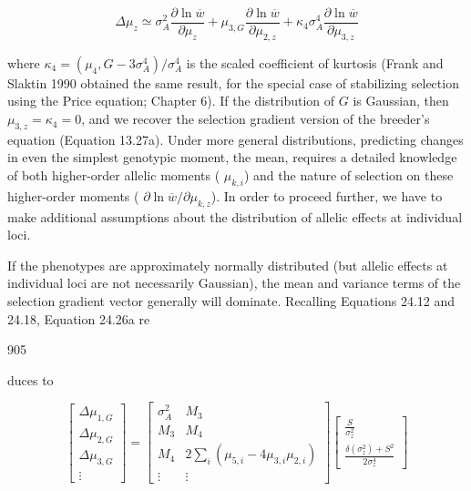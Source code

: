 \documentclass{article}
\begin{document}
\begin{equation}
\Delta\mu_{z}\simeq\sigma_{A}^{2}\frac{\partial\ln\overline{w}}{\partial\mu_{z}}+\mu_{3,G}\frac{\partial\ln\overline{w}}{\partial\mu_{2,z}}+\kappa_{4}\sigma_{A}^{4}\frac{\partial\ln\overline{w}}{\partial\mu_{3,z}}
\tag{24.27}
\label{eq:24_27}
\end{equation}

where  $ \kappa_4 = (\mu_4, G - 3\sigma_A^4)/\sigma_A^4 $ is the scaled coefficient of kurtosis (Frank and Slaktin 1990 obtained the same result, for the special case of stabilizing selection using the Price equation; Chapter 6). If the distribution of  $ G $ is Gaussian, then  $ \mu_{3,z} = \kappa_4 = 0 $, and we recover the selection gradient version of the breeder's equation (Equation 13.27a). Under more general distributions, predicting changes in even the simplest genotypic moment, the mean, requires a detailed knowledge of both higher-order allelic moments ( $ \mu_{k,i} $) and the nature of selection on these higher-order moments ( $ \partial \ln \overline{w} / \partial \mu_{k,z} $). In order to proceed further, we have to make additional assumptions about the distribution of allelic effects at individual loci.

If the phenotypes are approximately normally distributed (but allelic effects at individual loci are not necessarily Gaussian), the mean and variance terms of the selection gradient vector generally will dominate. Recalling Equations 24.12 and 24.18, Equation 24.26a re

905

duces to

\begin{equation}
\begin{bmatrix}\Delta\mu_{1,G}\\ \Delta\mu_{2,G}\\ \Delta\mu_{3,G}\\ \vdots\end{bmatrix}=\begin{bmatrix}\sigma_{A}^{2}&M_{3}\\ M_{3}&M_{4}\\ M_{4}&2\sum_{i}(\mu_{5,i}-4\mu_{3,i}\mu_{2,i})\\ \vdots&\vdots\end{bmatrix}\begin{bmatrix}\frac{S}{\sigma_{z}^{2}}\\ \frac{\delta(\sigma_{z}^{2})+S^{2}}{2\sigma_{z}^{4}}\end{bmatrix}
\end{equation}
\end{document}

